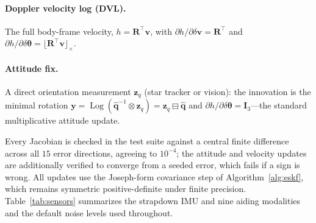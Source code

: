 \documentclass[11pt]{article}
\newcommand{\R}{\mathbf{R}}
\newcommand{\I}{\mathbf{I}}
\newcommand{\bv}{\mathbf{v}}
\newcommand{\bq}{\mathbf{q}}
\newcommand{\bz}{\mathbf{z}}
\newcommand{\skewm}[1]{\lfloor #1 \rfloor_\times}
\newcommand{\dtheta}{\delta\bm{\theta}}
\DeclareMathOperator{\Log}{Log}
\begin{document}
\paragraph{Doppler velocity log (DVL).}
The full body-frame velocity, $h=\R^\top\bv$, with $\partial h/\partial\delta\bv = \R^\top$ and
$\partial h/\partial\dtheta = \skewm{\R^\top\bv}$.

\paragraph{Attitude fix.}
A direct orientation measurement $\bz_q$ (star tracker or vision): the innovation is the minimal
rotation $\bm y = \Log(\hat{\bq}^{-1}\!\otimes\bz_q) = \bz_q\boxminus\hat{\bq}$ and
$\partial h/\partial\dtheta = \I_3$---the standard multiplicative attitude update.

\medskip
Every Jacobian is checked in the test suite against a central finite difference across all $15$ error
directions, agreeing to $10^{-4}$; the attitude and velocity updates are additionally verified to
converge from a seeded error, which fails if a sign is wrong. All updates use the Joseph-form covariance
step of Algorithm~\ref{alg:eskf}, which remains symmetric positive-definite under finite precision.
Table~\ref{tab:sensors} summarizes the strapdown IMU and nine aiding modalities and the default noise
levels used throughout.
\end{document}
